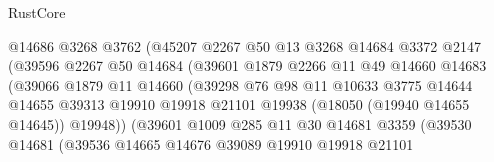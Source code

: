 \begin{lexlean}{RustCore}
\begin{coremodule}
                                @14686
                                @3268
                                @3762
                                (@45207
                                  @2267
                                  @50
                                  @13
                                  @3268
                                  @14684
                                  @3372
                                  @2147
                                  (@39596
                                    @2267
                                    @50
                                    @14684
                                    (@39601
                                      @1879
                                      @2266
                                      @11
                                      @49
                                      @14660
                                      @14683
                                      (@39066
                                        @1879
                                        @11
                                        @14660
                                        (@39298
                                          @76
                                          @98
                                          @11
                                          @10633
                                          @3775
                                          @14644
                                          @14655
                                          @39313
                                          @19910
                                          @19918
                                          @21101
                                          @19938
                                          (@18050 (@19940 @14655 @14645))
                                          @19948))
                                      (@39601
                                        @1009
                                        @285
                                        @11
                                        @30
                                        @14681
                                        @3359
                                        (@39530
                                          @14681
                                          (@39536
                                            @14665
                                            @14676
                                            @39089
                                            @19910
                                            @19918
                                            @21101

\end{coremodule}
\end{lexlean}
